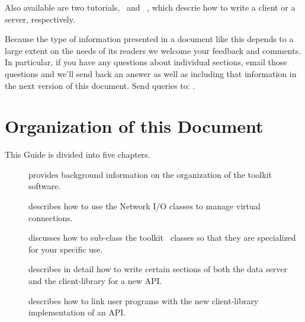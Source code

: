 Also available are two tutorials, \OPDwclient\ and \OPDwserver\ , which
descrie how to write a client or a server, respectively.

Because the type of information presented in a document like this depends to
a large extent on the needs of its readers we welcome your feedback and
comments. In particular, if you have any questions about individual sections,
email those questions and we'll send back an answer as well as including that
information in the next version of this document. Send queries to:
\DODSsupport.


\section{Organization of this Document}

This Guide is divided into five chapters. 

\begin{description}
  
\item[] provides background information on the
  organization of the toolkit software.

\item[] describes how to use the
Network I/O classes to manage virtual connections.

\item[] discusses how to sub-class the toolkit
\Cpp\ classes so that they are specialized for your specific use.

\item[] describes in detail how to write certain
sections of both the data server and the client-library for a new API.

\item[] describes how to link user programs
with the new client-library implementation of an API. 


\end{description}



\listconventions

